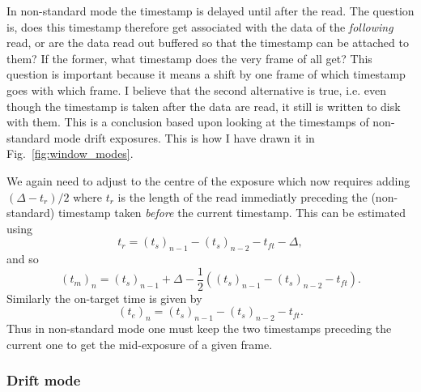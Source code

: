 \documentclass[10pt,a4paper,twocolumn]{article}
\begin{document}
In non-standard mode the timestamp is delayed until after the read. 
The question is, does this timestamp therefore get associated with
the data of the \emph{following} read, or are the data read out
buffered so that the timestamp can be attached to them? If the former,
what timestamp does the very frame of all get? This question is
important because it means a shift by one frame of which timestamp
goes with which frame. I believe that the second alternative is true,
i.e. even though the timestamp is taken after the data are read, it
still is written to disk with them. This is a conclusion based upon
looking at the timestamps of non-standard mode drift exposures.
This is how I have drawn it in Fig.~\ref{fig:window_modes}.
 
We again  need to adjust to the centre of the exposure which now
requires adding $(\Delta - t_r)/2$ where $t_r$ is the length of the
read immediatly preceding the (non-standard) timestamp taken
\emph{before} the current timestamp. This can be estimated using
\begin{equation}
t_r = (t_s)_{n-1} - (t_s)_{n-2} -  t_{ft}  - \Delta,
\end{equation}
and so 
\begin{equation}
(t_m)_n = (t_s)_{n-1} + \Delta - \frac{1}{2}\left( (t_s)_{n-1} - (t_s)_{n-2} -
        t_{ft} \right).
\end{equation} 
Similarly the on-target time is given by
\begin{equation}
(t_e)_n = (t_s)_{n-1} - (t_s)_{n-2} -  t_{ft}.
\end{equation}
Thus in non-standard mode one must keep the two timestamps preceding
the current one to get the mid-exposure of a given frame.

\subsubsection{Drift mode}
\end{document}

